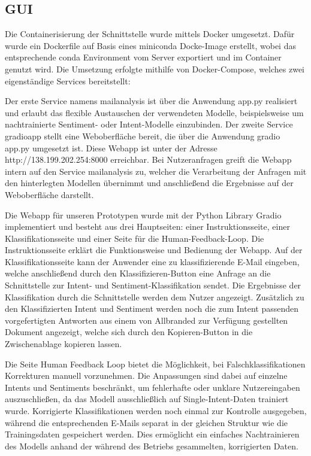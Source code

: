 \subsection{GUI}

Die Containerisierung der Schnittstelle wurde mittels Docker umgesetzt. Dafür wurde ein
Dockerfile auf Basis eines miniconda Docke-Image erstellt, wobei das entsprechende conda
Environment vom Server exportiert und im Container genutzt wird. Die Umsetzung erfolgte mithilfe
von Docker-Compose, welches zwei eigenständige Services bereitstellt: 

Der erste Service namens mailanalysis ist über die Anwendung app.py realisiert und erlaubt
das flexible Austauschen der verwendeten Modelle, beispielsweise um nachtrainierte Sentiment-
oder Intent-Modelle einzubinden. Der zweite Service gradioapp stellt eine Weboberfläche bereit,
die über die Anwendung gradio app.py umgesetzt ist. Diese Webapp ist unter der
Adresse http://138.199.202.254:8000 erreichbar. Bei Nutzeranfragen greift die Webapp intern
auf den Service mailanalysis zu, welcher die Verarbeitung der Anfragen mit den hinterlegten
Modellen übernimmt und anschließend die Ergebnisse auf der Weboberfläche darstellt. 

Die Webapp für unseren Prototypen wurde mit der Python Library Gradio implementiert und besteht
aus drei Hauptseiten: einer Instruktionsseite, einer Klassifikationsseite und einer Seite für
die Human-Feedback-Loop. Die Instruktionsseite erklärt die Funktionsweise und Bedienung
der Webapp. Auf der Klassifikationsseite kann der Anwender eine zu klassifizierende E-Mail
eingeben, welche anschließend durch den Klassifizieren-Button eine Anfrage an die Schnittstelle
zur Intent- und Sentiment-Klassifikation sendet. Die Ergebnisse der Klassifikation durch die
Schnittstelle werden dem Nutzer angezeigt. Zusätzlich zu den Klassifizierten Intent und Sentiment
werden noch die zum Intent passenden vorgefertigten Antworten aus einem von Allbranded zur
Verfügung gestellten Dokument angezeigt, welche sich durch den Kopieren-Button in die
Zwischenablage kopieren lassen.  

Die Seite Human Feedback Loop bietet die Möglichkeit, bei Falschklassifikationen Korrekturen
manuell vorzunehmen. Die Anpassungen sind dabei auf einzelne Intents und Sentiments beschränkt,
um fehlerhafte oder unklare Nutzereingaben auszuschließen, da das Modell ausschließlich auf
Single-Intent-Daten trainiert wurde. Korrigierte Klassifikationen werden noch einmal zur
Kontrolle ausgegeben, während die entsprechenden E-Mails separat in der gleichen Struktur
wie die Trainingsdaten gespeichert werden. Dies ermöglicht ein einfaches Nachtrainieren des
Modells anhand der während des Betriebs gesammelten, korrigierten Daten. 

